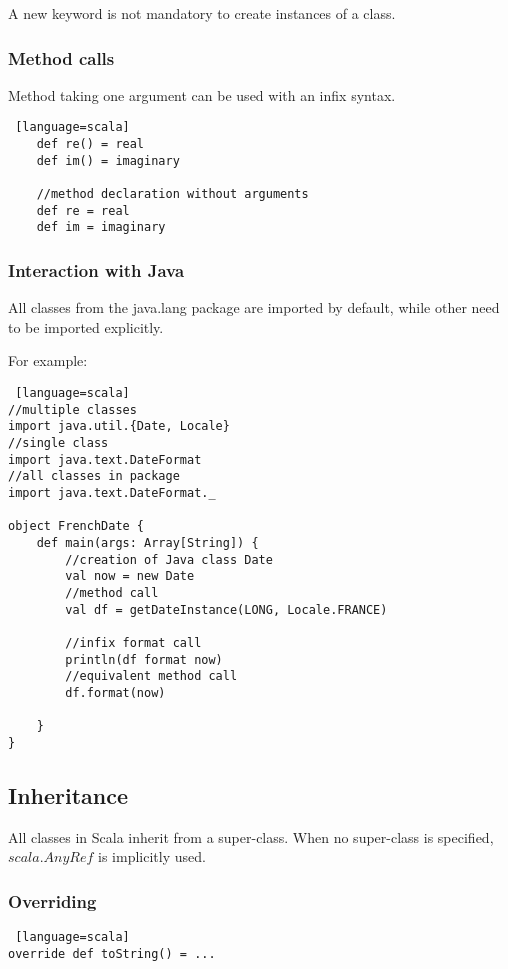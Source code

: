 \documentclass[12pt]{article}
\begin{document}
A new keyword is not mandatory to create instances of a class.

\subsubsection{Method calls}

Method taking one argument can be used with an infix syntax.

\begin{lstlisting} [language=scala]
	def re() = real
	def im() = imaginary

	//method declaration without arguments
	def re = real
	def im = imaginary
\end{lstlisting}


\subsubsection{Interaction with Java}
All classes from the java.lang package are imported by default, while other need to be imported explicitly.

For example:
\begin{lstlisting} [language=scala]
//multiple classes
import java.util.{Date, Locale} 
//single class
import java.text.DateFormat 
//all classes in package
import java.text.DateFormat._ 

object FrenchDate {
	def main(args: Array[String]) {
		//creation of Java class Date
		val now = new Date 
		//method call
		val df = getDateInstance(LONG, Locale.FRANCE) 
		
		//infix format call		
		println(df format now)
		//equivalent method call		
		df.format(now)

	}
}
\end{lstlisting}

\subsection{Inheritance}
All classes in Scala inherit from a super-class. When no super-class is specified, $scala.AnyRef$ is implicitly used.

\subsubsection{Overriding}

\begin{lstlisting} [language=scala]
override def toString() = ...
\end{lstlisting}
\end{document}
